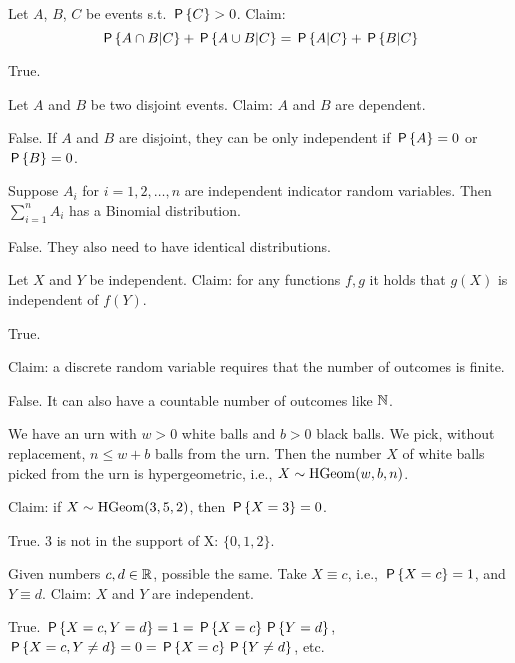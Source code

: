 \documentclass[tf-tutorial-all.tex]{subfiles}
\begin{document}
\begin{truefalse}
Let $A$, $B$, $C$ be events s.t. $\P{C}>0$. Claim:
\begin{equation}
\P{A \cap B | C} + \P{A \cup B | C}=\P{A|C}+\P{B|C}
\end{equation}
\begin{solution}
True.
\end{solution}
\end{truefalse}





\begin{truefalse}
Let $A$ and $B$ be two disjoint events. Claim: $A$ and $B$ are dependent.
\begin{solution}
False. If $A$ and $B$ are disjoint, they can be only independent if  $\P{A}=0$ or $\P{B}=0$.
\end{solution}
\end{truefalse}


\begin{truefalse}
Suppose $A_i$ for $i=1, 2, \dots, n$ are independent indicator random
variables. Then $\sum_{i=1}^n A_i$ has a Binomial distribution.
\begin{solution}
False. They also need to have identical distributions.
\end{solution}
\end{truefalse}

\begin{truefalse}
Let  $X$ and $Y$ be independent. Claim: for any functions $f, g$ it holds that $g(X)$ is independent of $f(Y)$.
\begin{solution}
True.
\end{solution}
\end{truefalse}

\begin{truefalse}
Claim: a  discrete random variable requires that the  number of outcomes is finite.
\begin{solution}
False. It can also have a countable number of outcomes like $\N$.
\end{solution}
\end{truefalse}

\begin{truefalse}
We have an urn with $w>0$ white balls and $b>0$ black balls.
We pick, without replacement, $n\leq w+b$ balls from the urn.
Then the number $X$ of white balls picked from the urn is hypergeometric, i.e., $X\sim\HGeom{w, b, n}$.

Claim: if  $X \sim \HGeom{3, 5, 2}$, then $\P{X = 3} = 0$.
\begin{solution}
True. $3$ is not in the support of X: $\{0, 1, 2\}$.
\end{solution}
\end{truefalse}

\begin{truefalse}
Given numbers $c, d \in \R$, possible the same.
Take $X\equiv c$, i.e., $\P{X=c} = 1$, and $Y\equiv d$.
Claim: $X$ and $Y$ are independent.
\begin{solution}
True. $\P{X=c, Y=d} = 1 = \P{X=c}\P{Y=d}$, $\P{X=c, Y\neq d} = 0 = \P{X=c} \P{Y\neq d}$, etc.
\end{solution}
\end{truefalse}
\end{document}
